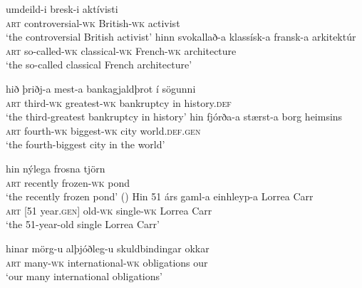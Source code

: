 \documentclass[output=paper,colorlinks,citecolor=brown]{langscibook}
\begin{document}
\begin{exe}
     \ex \label{free2a}
     \begin{xlist}         
        \ex  {} umdeild-i bresk-i aktívisti   \\ 
      \textsc{art} controversial-\textsc{wk} British-\textsc{wk} activist  \\
        \glt `the controversial British activist'        
      \ex \label{free2b} \gll  hinn svokallað-a klassísk-a fransk-a  arkitektúr  \\  
      \textsc{art}  so-called-\textsc{wk} classical-\textsc{wk} French-\textsc{wk} architecture \\   
        \glt `the so-called classical French architecture'             
     \end{xlist}
     \ex \label{free2c}
     \begin{xlist}
      \ex  \gll hið þriðj-a mest-a bankagjaldþrot {í sögunni}  \\
      \textsc{art} third-\textsc{wk} greatest-\textsc{wk} bankruptcy {in history.\textsc{def} }  \\  
        \glt `the third-greatest bankruptcy in history'        
      \ex \label{free2cc} \gll hin fjórða-a stærst-a borg heimsins  \\
      \textsc{art} fourth-\textsc{wk} biggest-\textsc{wk} city world.\textsc{def}.\textsc{gen}  \\  
        \glt `the fourth-biggest city in the world'        
     \end{xlist}
    \ex \label{free2d}
    \begin{xlist}
      \ex  \gll  hin nýlega frosna  tjörn  \\ 
      \textsc{art} recently frozen-\textsc{wk}  pond \\
        \glt `the recently frozen pond'  (\citealt[3]{Sigurdsson2013resPass})   
      \ex \label{free2e} \gll Hin { 51 árs} gaml-a  einhleyp-a {Lorrea Carr} \\ 
      \textsc{art} [{51 year.\textsc{gen}}]  old-\textsc{wk} single-\textsc{wk}  {Lorrea Carr} \\ 
        \glt `the 51-year-old single Lorrea Carr'        
    \end{xlist}
    \ex \label{free2f}
    \begin{xlist}
    \ex \label{free2fa} \gll hinar mörg-u alþjóðleg-u skuldbindingar okkar  \\ 
      \textsc{art}  many-\textsc{wk} international-\textsc{wk}  obligations our  \\ 
     \glt `our many international obligations'        


\end{xlist}
\end{exe}
\end{document}
